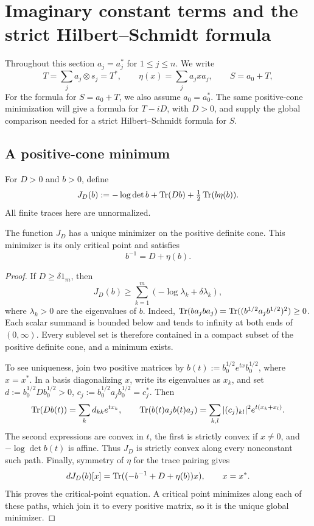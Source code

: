 \section{Imaginary constant terms and the strict Hilbert--Schmidt formula}
\label{sec:imaginary-hs}

Throughout this section $a_j=a_j^*$ for $1\le j\le n$.
We write
\[
 T=\sum_j a_j\otimes s_j=T^*,\qquad
 \eta(x)=\sum_j a_jxa_j,\qquad S=a_0+T,
\]
For the formula for $S=a_0+T$, we also assume $a_0=a_0^*$.
The same positive-cone minimization will give a formula for $T-iD$, with $D>0$, and supply the global comparison needed for a strict Hilbert--Schmidt formula for $S$.

\subsection{A positive-cone minimum}
For $D>0$ and $b>0$, define
\begin{equation}\label{eq:imaginary-action}
 J_D(b):=-\log\det b+\operatorname{Tr}(Db)+\tfrac12\operatorname{Tr}(b\eta(b)).
\end{equation}
All finite traces here are unnormalized.

\begin{lemma}\label{lem:imaginary-minimum}
The function $J_D$ has a unique minimizer on the positive definite cone.
This minimizer is its only critical point and satisfies
\begin{equation}\label{eq:imaginary-critical}
 b^{-1}=D+\eta(b).
\end{equation}
\end{lemma}
\begin{proof}
If $D\ge\delta1_m$, then
\[
 J_D(b)\ge\sum_{k=1}^m(-\log\lambda_k+\delta\lambda_k),
\]
where $\lambda_k>0$ are the eigenvalues of $b$.
Indeed, $\operatorname{Tr}(ba_jba_j)=\operatorname{Tr}((b^{1/2}a_jb^{1/2})^2)\ge0$.
Each scalar summand is bounded below and tends to infinity at both ends of $(0,\infty)$.
Every sublevel set is therefore contained in a compact subset of the positive definite cone, and a minimum exists.

To see uniqueness, join two positive matrices by $b(t):=b_0^{1/2}e^{tx}b_0^{1/2}$, where $x=x^*$.
In a basis diagonalizing $x$, write its eigenvalues as $x_k$, and set $d:=b_0^{1/2}Db_0^{1/2}>0$, $c_j:=b_0^{1/2}a_jb_0^{1/2}=c_j^*$.
Then
\[
 \operatorname{Tr}(Db(t))=\sum_k d_{kk}e^{tx_k},\qquad
 \operatorname{Tr}(b(t)a_jb(t)a_j)=\sum_{k,l}|(c_j)_{kl}|^2e^{t(x_k+x_l)}.
\]
The second expressions are convex in $t$, the first is strictly convex if $x\ne0$, and $-\log\det b(t)$ is affine.
Thus $J_D$ is strictly convex along every nonconstant such path.
Finally, symmetry of $\eta$ for the trace pairing gives
\[
 dJ_D(b)[x]=\operatorname{Tr}((-b^{-1}+D+\eta(b))x),\qquad x=x^*.
\]
This proves the critical-point equation.
A critical point minimizes along each of these paths, which join it to every positive matrix, so it is the unique global minimizer.
\end{proof}

